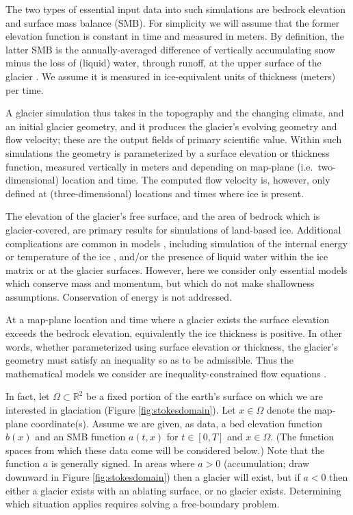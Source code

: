 \documentclass[hidelinks,onefignum,onetabnum,final]{siamart220329}  %
\newcommand{\RR}{\mathbb{R}}
\begin{document}
The two types of essential input data into such simulations are bedrock elevation and surface mass balance (SMB).  For simplicity we will assume that the former elevation function is constant in time and measured in meters.  By definition, the latter SMB is the annually-averaged difference of vertically accumulating snow minus the loss of (liquid) water, through runoff, at the upper surface of the glacier \cite{Cogleyetal2011}.  We assume it is measured in ice-equivalent units of thickness (meters) per time.

A glacier simulation thus takes in the topography and the changing climate, and an initial glacier geometry, and it produces the glacier's evolving geometry and flow velocity; these are the output fields of primary scientific value.  Within such simulations the geometry is parameterized by a surface elevation or thickness function, measured vertically in meters and depending on map-plane (i.e.~two-dimensional) location and time.  The computed flow velocity is, however, only defined at (three-dimensional) locations and times where ice is present.

The elevation of the glacier's free surface, and the area of bedrock which is glacier-covered, are primary results for simulations of land-based ice.  Additional complications are common in models \cite{GreveBlatter2009}, including simulation of the internal energy  or temperature of the ice \cite{Aschwandenetal2012}, and/or the presence of liquid water within the ice matrix or at the glacier surfaces.  However, here we consider only essential models which conserve mass and momentum, but which do not make shallowness assumptions.  Conservation of energy is not addressed.

At a map-plane location and time where a glacier exists the surface elevation exceeds the bedrock elevation, equivalently the ice thickness is positive.  In other words, whether parameterized using surface elevation or thickness, the glacier's geometry must satisfy an inequality so as to be admissible.  Thus the mathematical models we consider are inequality-constrained flow equations \cite{Bueler2021conservation}.

In fact, let $\Omega \subset \RR^2$ be a fixed portion of the earth's surface on which we are interested in glaciation (Figure \ref{fig:stokesdomain}).  Let $x\in\Omega$ denote the map-plane coordinate(s).  Assume we are given, as data, a bed elevation function $b(x)$ and an SMB function $a(t,x)$ for $t\in [0,T]$ and $x\in \Omega$.  (The function spaces from which these data come will be considered below.)  Note that the function $a$ is generally signed.  In areas where $a>0$ (accumulation; draw downward in Figure \ref{fig:stokesdomain}) then a glacier will exist, but if $a<0$ then either a glacier exists with an ablating surface, or no glacier exists.  Determining which situation applies requires solving a free-boundary problem.
\end{document}
